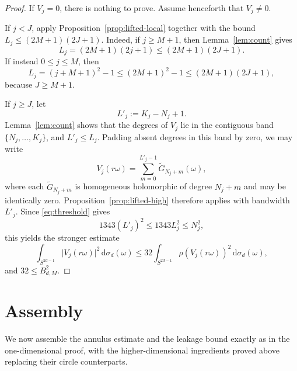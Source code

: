 \documentclass[11pt]{amsart}
\theoremstyle{remark}
\newcommand{\abs}[1]{\lvert #1 \rvert}
\newcommand{\dd}{\mathrm{d}}
\newcommand{\rhoFn}{\rho}
\newcommand{\Sphere}{S^{2d-1}}
\begin{document}
\begin{proof}
If $V_j=0$, there is nothing to prove.  Assume henceforth that $V_j \ne 0$.

If $j < J$, apply Proposition~\ref{prop:lifted-local} together with the
bound $L_j \le (2M+1)(2J+1)$.  Indeed, if $j \ge M+1$, then
Lemma~\ref{lem:count} gives
\[
L_j = (2M+1)(2j+1) \le (2M+1)(2J+1).
\]
If instead $0 \le j \le M$, then
\[
L_j = (j+M+1)^2-1 \le (2M+1)^2-1 \le (2M+1)(2J+1),
\]
because $J \ge M+1$.

If $j \ge J$, let
\[
L'_j := K_j-N_j+1.
\]
Lemma~\ref{lem:count} shows that the degrees of $V_j$ lie in the
contiguous band $\{N_j,\dots,K_j\}$, and $L'_j \le L_j$.  Padding absent
degrees in this band by zero, we may write
\[
V_j(r\omega)
=
\sum_{m=0}^{L'_j-1} \widetilde G_{N_j+m}(\omega),
\]
where each $\widetilde G_{N_j+m}$ is homogeneous holomorphic of degree
$N_j+m$ and may be identically zero.  Proposition~\ref{prop:lifted-high}
therefore applies with bandwidth $L'_j$.  Since
\eqref{eq:threshold} gives
\[
1343(L'_j)^2 \le 1343L_j^2 \le N_j^2,
\]
this yields the stronger estimate
\[
\int_{\Sphere} \abs{V_j(r\omega)}^2\,\dd \sigma_d(\omega)
\le
32
\int_{\Sphere} \rhoFn(V_j(r\omega))^2\,\dd \sigma_d(\omega),
\]
and $32 \le B_{d,M}^2$.
\end{proof}

\section{Assembly}\label{sec:assembly}

We now assemble the annulus estimate and the leakage bound exactly as in the
one-dimensional proof, with the higher-dimensional ingredients proved above
replacing their circle counterparts.
\end{document}
